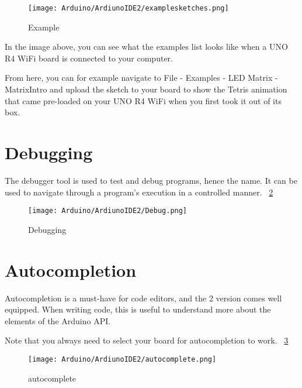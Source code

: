 \begin{figure}
    \begin{center}
        \texttt{[image: Arduino/ArdiunoIDE2/examplesketches.png]}
        \caption{Example}
        \label{examplesketches}
    \end{center}
\end{figure}

In the image above, you can see what the examples list looks like when a UNO R4 WiFi board is connected to your computer.

From here, you can for example navigate to File - Examples - LED Matrix - MatrixIntro and upload the sketch to your board to show the Tetris animation that came pre-loaded on your UNO R4 WiFi when you first took it out of its box.

\section{Debugging}

The debugger tool is used to test and debug programs, hence the name. It can be used to navigate through a program's execution in a controlled manner. ~\ref{Debug}

\begin{figure}
    \begin{center}
        \texttt{[image: Arduino/ArdiunoIDE2/Debug.png]}
        \caption{Debugging}
        \label{Debug}
    \end{center}
\end{figure}

\section{Autocompletion}
Autocompletion is a must-have for code editors, and the 2 version comes well equipped. When writing code, this is useful to understand more about the elements of the Arduino API.

Note that you always need to select your board for autocompletion to work. ~\ref{autocomplete}

\begin{figure}
    \begin{center}
        \texttt{[image: Arduino/ArdiunoIDE2/autocomplete.png]}
        \caption{autocomplete}
        \label{autocomplete}
    \end{center}
\end{figure}

